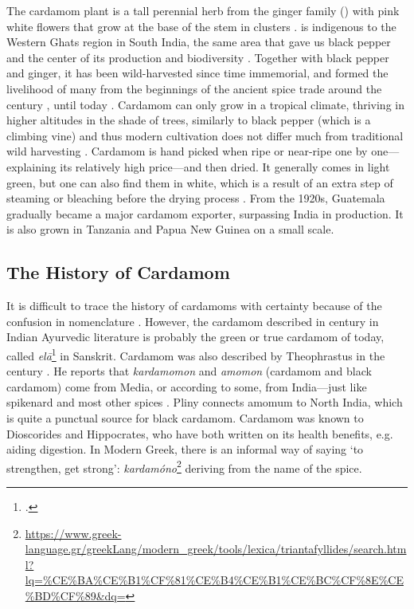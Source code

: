 The cardamom plant is a tall perennial herb from the ginger family () with pink white flowers that grow at the base of the stem in clusters \autocite[132]{van_wyk_culinary_2014}.  is indigenous to the Western Ghats region in South India, the same area that gave us black pepper and the center of its production and biodiversity \autocite[1]{ravindran_cardamom_2002}. Together with black pepper and ginger, it has been wild-harvested since time immemorial, and formed the livelihood of many from the beginnings of the ancient spice trade around the  century \BC{}, until today \autocite[132]{van_wyk_culinary_2014}. Cardamom can only grow in a tropical climate, thriving in higher altitudes in the shade of trees, similarly to black pepper (which is a climbing vine) and thus modern cultivation does not differ much from traditional wild harvesting \autocite[132]{van_wyk_culinary_2014}. Cardamom is hand picked when ripe or near-ripe one by one---explaining its relatively high price---and then dried. It generally comes in light green, but one can also find them in white, which is a result of an extra step of steaming or bleaching before the drying process \autocite[132]{van_wyk_culinary_2014}. From the 1920s, Guatemala gradually became a major cardamom exporter, surpassing India in production. It is also grown in Tanzania and Papua New Guinea on a small scale.

\subsection{The History of Cardamom}

It is difficult to trace the history of cardamoms with certainty because of the confusion in nomenclature \autocite{cumo_encyclopedia_2013}. However, the cardamom described in  century \BC{} in Indian Ayurvedic literature is probably the green or true cardamom of today, called \textit{el\={a}}\footcite[232]{monier-williams_sanskrit-english_1899} in Sanskrit. Cardamom was also described by Theophrastus in the  century \BC{}. He reports that \textit{kardamomon} and \textit{amomon} (cardamom and black cardamom) come from Media, or according to some, from India---just like spikenard and most other spices \autocite[249]{theophrastus_enquiry_1916}. Pliny connects amomum to North India, which is quite a punctual source for black cardamom. Cardamom was known to Dioscorides and Hippocrates, who have both written on its health benefits, e.g. aiding digestion. In Modern Greek, there is an informal way of saying `to strengthen, get strong':  \textit{kardamóno}\footnote{\url{https://www.greek-language.gr/greekLang/modern_greek/tools/lexica/triantafyllides/search.html?lq=\%CE\%BA\%CE\%B1\%CF\%81\%CE\%B4\%CE\%B1\%CE\%BC\%CF\%8E\%CE\%BD\%CF\%89\&dq=}} deriving from the name of the spice.

